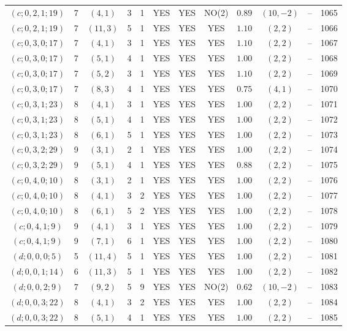 \begin{longtable}{|c|c|c|c|c|c|c|c|c|c|c|c|}
$(c;0,2,1;19)$ & 7 & $(4,1)$ & 3 & 1 & YES & YES & NO(2) & $0.89$ & $(10,-2)$ & -- & 1065\\
$(c;0,2,1;19)$ & 7 & $(11,3)$ & 5 & 1 & YES & YES & YES & $1.10$ & $(2,2)$ & -- & 1066\\
$(c;0,3,0;17)$ & 7 & $(4,1)$ & 3 & 1 & YES & YES & YES & $1.10$ & $(2,2)$ & -- & 1067\\
$(c;0,3,0;17)$ & 7 & $(5,1)$ & 4 & 1 & YES & YES & YES & $1.00$ & $(2,2)$ & -- & 1068\\
$(c;0,3,0;17)$ & 7 & $(5,2)$ & 3 & 1 & YES & YES & YES & $1.10$ & $(2,2)$ & -- & 1069\\
$(c;0,3,0;17)$ & 7 & $(8,3)$ & 4 & 1 & YES & YES & YES & $0.75$ & $(4,1)$ & -- & 1070\\
$(c;0,3,1;23)$ & 8 & $(4,1)$ & 3 & 1 & YES & YES & YES & $1.00$ & $(2,2)$ & -- & 1071\\
$(c;0,3,1;23)$ & 8 & $(5,1)$ & 4 & 1 & YES & YES & YES & $1.00$ & $(2,2)$ & -- & 1072\\
$(c;0,3,1;23)$ & 8 & $(6,1)$ & 5 & 1 & YES & YES & YES & $1.00$ & $(2,2)$ & -- & 1073\\
$(c;0,3,2;29)$ & 9 & $(3,1)$ & 2 & 1 & YES & YES & YES & $1.00$ & $(2,2)$ & -- & 1074\\
$(c;0,3,2;29)$ & 9 & $(5,1)$ & 4 & 1 & YES & YES & YES & $0.88$ & $(2,2)$ & -- & 1075\\
$(c;0,4,0;10)$ & 8 & $(3,1)$ & 2 & 1 & YES & YES & YES & $1.00$ & $(2,2)$ & -- & 1076\\
$(c;0,4,0;10)$ & 8 & $(4,1)$ & 3 & 2 & YES & YES & YES & $1.00$ & $(2,2)$ & -- & 1077\\
$(c;0,4,0;10)$ & 8 & $(6,1)$ & 5 & 2 & YES & YES & YES & $1.00$ & $(2,2)$ & -- & 1078\\
$(c;0,4,1;9)$ & 9 & $(4,1)$ & 3 & 1 & YES & YES & YES & $1.00$ & $(2,2)$ & -- & 1079\\
$(c;0,4,1;9)$ & 9 & $(7,1)$ & 6 & 1 & YES & YES & YES & $1.00$ & $(2,2)$ & -- & 1080\\
$(d;0,0,0;5)$ & 5 & $(11,4)$ & 5 & 1 & YES & YES & YES & $1.00$ & $(2,2)$ & -- & 1081\\
$(d;0,0,1;14)$ & 6 & $(11,3)$ & 5 & 1 & YES & YES & YES & $1.00$ & $(2,2)$ & -- & 1082\\
$(d;0,0,2;9)$ & 7 & $(9,2)$ & 5 & 9 & YES & YES & NO(2) & $0.62$ & $(10,-2)$ & -- & 1083\\
$(d;0,0,3;22)$ & 8 & $(4,1)$ & 3 & 2 & YES & YES & YES & $1.00$ & $(2,2)$ & -- & 1084\\
$(d;0,0,3;22)$ & 8 & $(5,1)$ & 4 & 1 & YES & YES & YES & $1.00$ & $(2,2)$ & -- & 1085\\

\end{longtable}

